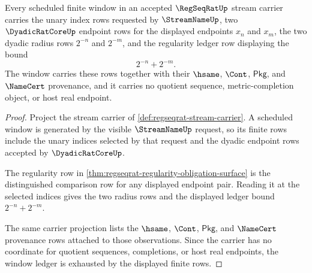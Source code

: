 \begin{theorem}
\label{thm:regseqrat-window-regularity-ledger}
Every scheduled finite window in an accepted $\RegSeqRatUp$ stream carrier carries the unary index rows requested by $\StreamNameUp$, two $\DyadicRatCoreUp$ endpoint rows for the displayed endpoints $x_n$ and $x_m$, the two dyadic radius rows $2^{-n}$ and $2^{-m}$, and the regularity ledger row displaying the bound
$$
2^{-n}+2^{-m}.
$$
The window carries these rows together with their $\hsame$, $\Cont$, $\mathsf{Pkg}$, and $\NameCert$ provenance, and it carries no quotient sequence, metric-completion object, or host real endpoint.
\end{theorem}
\begin{proof}
Project the stream carrier of \autoref{def:regseqrat-stream-carrier}. A scheduled window is generated by the visible $\StreamNameUp$ request, so its finite rows include the unary indices selected by that request and the dyadic endpoint rows accepted by $\DyadicRatCoreUp$.

The regularity row in \autoref{thm:regseqrat-regularity-obligation-surface} is the distinguished comparison row for any displayed endpoint pair. Reading it at the selected indices gives the two radius rows and the displayed ledger bound $2^{-n}+2^{-m}$.

The same carrier projection lists the $\hsame$, $\Cont$, $\mathsf{Pkg}$, and $\NameCert$ provenance rows attached to those observations. Since the carrier has no coordinate for quotient sequences, completions, or host real endpoints, the window ledger is exhausted by the displayed finite rows.
\end{proof}

